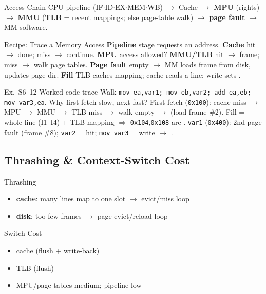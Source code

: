 \begin{definition}{Access Chain}
    CPU pipeline (IF$\cdot$ID$\cdot$EX$\cdot$MEM$\cdot$WB) $\to$ Cache $\to$ \textbf{MPU} (rights) $\to$ \textbf{MMU} (\textbf{TLB} = recent mappings; else page-table walk) $\to$ \textbf{page fault} $\to$ MM software.
\end{definition}

\begin{KR}{Recipe: Trace a Memory Access}
    \textbf{Pipeline} stage requests an address.
    \textbf{Cache} hit $\to$ done; miss $\to$ continue.
    \textbf{MPU} access allowed?
    \textbf{MMU/TLB} hit $\to$ frame; miss $\to$ walk page tables.
    \textbf{Page fault} empty $\to$ MM loads frame from disk, updates page dir.
    \textbf{Fill} TLB caches mapping; cache reads a line; write sets .
\end{KR}

\begin{example2}{Ex.\ S6--12 Worked code trace}
    Walk \texttt{mov ea,var1; mov eb,var2; add ea,eb; mov var3,ea}. Why first fetch slow, next fast?
    \tcblower
    First fetch (\texttt{0x100}): cache miss $\to$ MPU $\to$ MMU $\to$ TLB miss $\to$ walk empty $\to$  (load frame \#2). Fill = whole line (I1--I4) + TLB mapping $\Rightarrow$ \texttt{0x104},\texttt{0x108} are . \texttt{var1} (\texttt{0x400}): 2nd page fault (frame \#8); \texttt{var2} = hit; \texttt{mov var3} = write $\to$ .
\end{example2}

\subsection{Thrashing \& Context-Switch Cost}


\begin{definition}{Thrashing}
    \begin{itemize}
        \item \textbf{cache}: many lines map to one slot $\to$ evict/miss loop
        \item \textbf{disk}: too few frames $\to$ page evict/reload loop
    \end{itemize}
\end{definition}

\begin{concept}{Switch Cost}
    \begin{itemize}
        \item cache  (flush + write-back)
        \item TLB  (flush)
        \item MPU/page-tables medium; pipeline low
    \end{itemize}
\end{concept}

